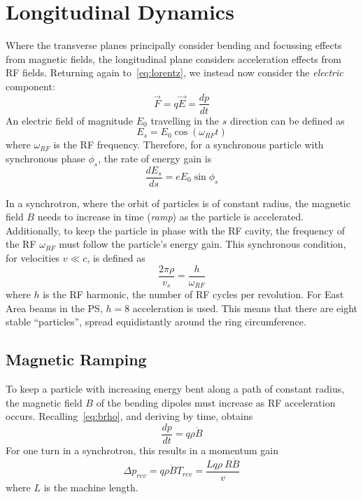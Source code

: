 \documentclass[11pt]{report}
\begin{document}
\section{Longitudinal Dynamics}\label{sec:long}

Where the transverse planes principally consider bending and focussing effects from magnetic fields, the longitudinal plane considers acceleration effects from RF fields. Returning again to~\autoref{eq:lorentz}, we instead now consider the \textit{electric} component:
\begin{equation}
  \vec F = q\vec E = \frac{dp}{dt}
\end{equation} 
An electric field of magnitude $E_0$ travelling in the $s$ direction can be defined as
\begin{equation}
  E_s = E_0\cos(\omega_{RF}t)
\end{equation} where $\omega_{RF}$ is the RF frequency. Therefore, for a synchronous particle with synchronous phase $\phi_s$, the rate of energy gain is
\begin{equation}
  \frac{dE_s}{ds}=eE_0\sin\phi_s
\end{equation}

In a synchrotron, where the orbit of particles is of constant radius, the magnetic field $B$ needs to increase in time (\textit{ramp}) as the particle is accelerated. Additionally, to keep the particle in phase with the RF cavity, the frequency of the RF $\omega_{RF}$ must follow the particle's energy gain. This synchronous condition, for velocities $v\ll c$, is defined as
\begin{equation}
  \frac{2\pi\rho}{v_s}=\frac h{\omega_{RF}}
\end{equation} where $h$ is the RF harmonic, the number of RF cycles per revolution. For East Area beams in the PS, $h=8$ acceleration is used. This means that there are eight stable ``particles'', spread equidistantly around the ring circumference. 


\subsection{Magnetic Ramping}

To keep a particle with increasing energy bent along a path of constant radius, the magnetic field $B$ of the bending dipoles must increase as RF acceleration occurs. Recalling~\autoref{eq:brho}, and deriving by time, obtains
\begin{equation}
  \frac{dp}{dt} = q\rho\dot B
\end{equation}
For one turn in a synchrotron, this results in a momentum gain
\begin{equation}
  \Delta p_{rev} = q\rho\dot B T_{rev}=\frac{Lq\rho~R\dot B}v
\end{equation} where $L$ is the machine length. 
\end{document}
